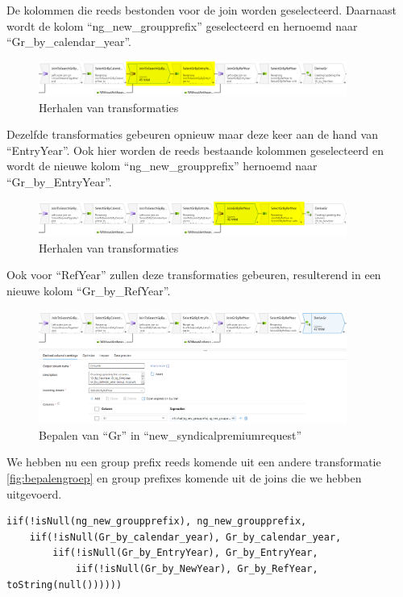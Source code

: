 De kolommen die reeds bestonden voor de join worden geselecteerd. Daarnaast wordt de kolom ``ng\_new\_groupprefix'' geselecteerd en hernoemd naar ``Gr\_by\_calendar\_year''.

\begin{figure}[H]
    \centering
    \includegraphics[width=0.9\textwidth]{./graphics/adf/gr_3.png}
    \caption{Herhalen van transformaties}
\end{figure}

Dezelfde transformaties gebeuren opnieuw maar deze keer aan de hand van ``EntryYear''. Ook hier worden de reeds bestaande kolommen geselecteerd en wordt de nieuwe kolom ``ng\_new\_groupprefix'' hernoemd naar ``Gr\_by\_EntryYear''.

\begin{figure}[H]
    \centering
    \includegraphics[width=0.9\textwidth]{./graphics/adf/gr_4.png}
    \caption{Herhalen van transformaties}
\end{figure}

Ook voor ``RefYear'' zullen deze transformaties gebeuren, resulterend in een nieuwe kolom ``Gr\_by\_RefYear''.

\begin{figure}[H]
    \centering
    \includegraphics[width=0.9\textwidth]{./graphics/adf/gr_5.png}
    \caption{Bepalen van ``Gr'' in ``new\_syndicalpremiumrequest''}
\end{figure}

We hebben nu een group prefix reeds komende uit een andere transformatie \ref{fig:bepalengroep} en group prefixes komende uit de joins die we hebben uitgevoerd.

\begin{verbatim}
iif(!isNull(ng_new_groupprefix), ng_new_groupprefix, 
    iif(!isNull(Gr_by_calendar_year), Gr_by_calendar_year,
        iif(!isNull(Gr_by_EntryYear), Gr_by_EntryYear,
            iif(!isNull(Gr_by_NewYear), Gr_by_RefYear, toString(null())))))
\end{verbatim}

